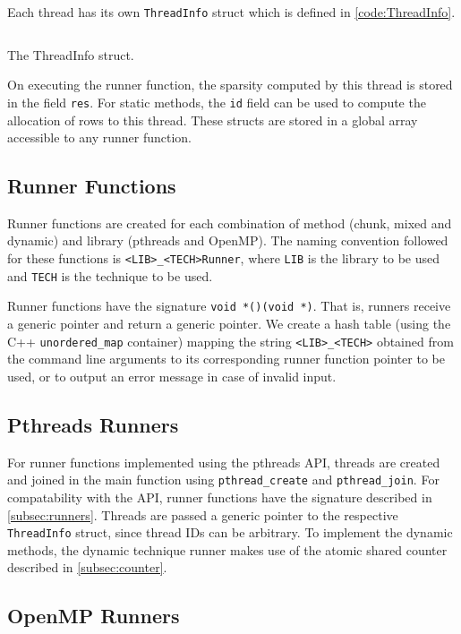\documentclass[conference,compsoc]{IEEEtran}
\begin{document}
Each thread has its own \texttt{ThreadInfo} struct which is defined in
\autoref{code:ThreadInfo}.

\begin{listing}[!ht]
\inputminted{cpp}{codes/ThreadInfo.cpp}
\caption{The ThreadInfo struct.}
\label{code:ThreadInfo}
\end{listing}

On executing the runner function, the sparsity computed by this thread is stored
in the field \texttt{res}. For static methods, the \texttt{id} field can be used
to compute the allocation of rows to this thread. These structs are stored in a
global array accessible to any runner function.

\subsection{Runner Functions}
\label{subsec:runners}

Runner functions are created for each combination of method (chunk, mixed and
dynamic) and library (pthreads and OpenMP). The naming convention followed for
these functions is \texttt{<LIB>\_<TECH>Runner}, where \texttt{LIB} is the
library to be used and \texttt{TECH} is the technique to be used.

Runner functions have the signature \texttt{void *()(void *)}. That is, runners
receive a generic pointer and return a generic pointer. We create a hash table
(using the C++ \texttt{unordered\_map} container) mapping the string
\texttt{<LIB>\_<TECH>} obtained from the command line arguments to its
corresponding runner function pointer to be used, or to output an error message
in case of invalid input.

\subsection{Pthreads Runners}
\label{subsec:pthreads}

For runner functions implemented using the pthreads API, threads are created and
joined in the main function using \texttt{pthread\_create} and
\texttt{pthread\_join}. For compatability with the API, runner functions have
the signature described in \autoref{subsec:runners}. Threads are passed a
generic pointer to the respective \texttt{ThreadInfo} struct, since thread IDs
can be arbitrary. To implement the dynamic methods, the dynamic technique runner
makes use of the atomic shared counter described in \autoref{subsec:counter}.

\subsection{OpenMP Runners}
\label{subsec:openmp}
\end{document}
